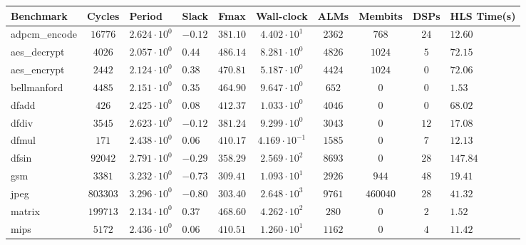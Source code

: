\begin{tabular}{|l|c|HHc|c|c|c|cH|}
\hline
Benchmark     & Cycles       & Period                 & Slack     & Fmax       & Wall-clock              & ALMs      & Membits    & DSPs    & HLS Time(s) \\
\hline
adpcm\_encode & $ 16776    $ & $ 2.624 \cdot 10^{0} $ & $ -0.12 $ & $ 381.10 $ & $ 4.402 \cdot 10^{1}  $ & $ 2362  $ & $ 768    $ & $ 24  $ & $ 12.60   $ \\
aes\_decrypt  & $ 4026     $ & $ 2.057 \cdot 10^{0} $ & $ 0.44  $ & $ 486.14 $ & $ 8.281 \cdot 10^{0}  $ & $ 4826  $ & $ 1024   $ & $ 5   $ & $ 72.15   $ \\
aes\_encrypt  & $ 2442     $ & $ 2.124 \cdot 10^{0} $ & $ 0.38  $ & $ 470.81 $ & $ 5.187 \cdot 10^{0}  $ & $ 4424  $ & $ 1024   $ & $ 0   $ & $ 72.06   $ \\
bellmanford   & $ 4485     $ & $ 2.151 \cdot 10^{0} $ & $ 0.35  $ & $ 464.90 $ & $ 9.647 \cdot 10^{0}  $ & $ 652   $ & $ 0      $ & $ 0   $ & $ 1.53    $ \\
dfadd         & $ 426      $ & $ 2.425 \cdot 10^{0} $ & $ 0.08  $ & $ 412.37 $ & $ 1.033 \cdot 10^{0}  $ & $ 4046  $ & $ 0      $ & $ 0   $ & $ 68.02   $ \\
dfdiv         & $ 3545     $ & $ 2.623 \cdot 10^{0} $ & $ -0.12 $ & $ 381.24 $ & $ 9.299 \cdot 10^{0}  $ & $ 3043  $ & $ 0      $ & $ 12  $ & $ 17.08   $ \\
dfmul         & $ 171      $ & $ 2.438 \cdot 10^{0} $ & $ 0.06  $ & $ 410.17 $ & $ 4.169 \cdot 10^{-1} $ & $ 1585  $ & $ 0      $ & $ 7   $ & $ 12.13   $ \\
dfsin         & $ 92042    $ & $ 2.791 \cdot 10^{0} $ & $ -0.29 $ & $ 358.29 $ & $ 2.569 \cdot 10^{2}  $ & $ 8693  $ & $ 0      $ & $ 28  $ & $ 147.84  $ \\
gsm           & $ 3381     $ & $ 3.232 \cdot 10^{0} $ & $ -0.73 $ & $ 309.41 $ & $ 1.093 \cdot 10^{1}  $ & $ 2926  $ & $ 944    $ & $ 48  $ & $ 19.41   $ \\
jpeg          & $ 803303   $ & $ 3.296 \cdot 10^{0} $ & $ -0.80 $ & $ 303.40 $ & $ 2.648 \cdot 10^{3}  $ & $ 9761  $ & $ 460040 $ & $ 28  $ & $ 41.32   $ \\
matrix        & $ 199713   $ & $ 2.134 \cdot 10^{0} $ & $ 0.37  $ & $ 468.60 $ & $ 4.262 \cdot 10^{2}  $ & $ 280   $ & $ 0      $ & $ 2   $ & $ 1.52    $ \\
mips          & $ 5172     $ & $ 2.436 \cdot 10^{0} $ & $ 0.06  $ & $ 410.51 $ & $ 1.260 \cdot 10^{1}  $ & $ 1162  $ & $ 0      $ & $ 4   $ & $ 11.42   $ \\

\end{tabular}

